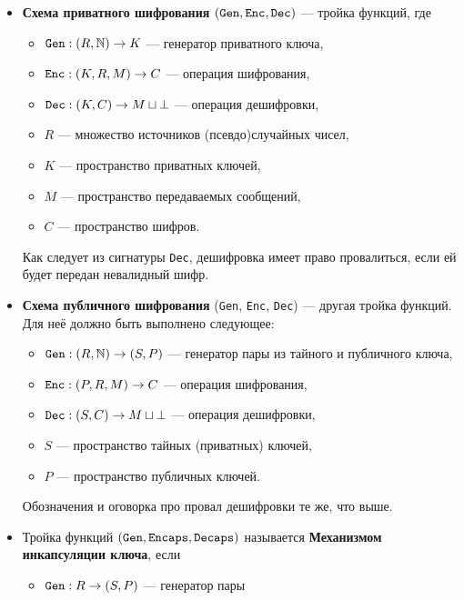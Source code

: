 \documentclass[a4paper,14pt]{extarticle}
\begin{document}
\begin{itemize}
    \item \textbf{Схема приватного шифрования}
        $(\verb|Gen|, \verb|Enc|, \verb|Dec|)$ --- тройка функций, где
        \begin{itemize}
            \item $\verb|Gen|: (R, \mathbb{N}) \to K$ --- генератор приватного
                ключа,
            \item $\verb|Enc|: (K, R, M) \to C$ --- операция шифрования,
            \item $\verb|Dec|: (K, C) \to M \sqcup \bot$ --- операция
                дешифровки,
            \item $R$ --- множество источников (псевдо)случайных чисел,
            \item $K$ --- пространство приватных ключей,
            \item $M$ --- пространство передаваемых сообщений,
            \item $C$ --- пространство шифров.
        \end{itemize}
        Как следует из сигнатуры \verb|Dec|, дешифровка имеет право провалиться,
        если ей будет передан невалидный шифр.
    \item \textbf{Схема публичного шифрования}
        (\verb|Gen|, \verb|Enc|, \verb|Dec|) --- другая тройка функций. Для неё
        должно быть выполнено следующее:
        \begin{itemize}
            \item $\verb|Gen|: (R, \mathbb{N}) \to (S, P)$ --- генератор пары
                из тайного и публичного ключа,
            \item $\verb|Enc|: (P, R, M) \to C$ --- операция шифрования,
            \item $\verb|Dec|: (S, C) \to M \sqcup \bot$ --- операция
                дешифровки,
            \item $S$ --- пространство тайных (приватных) ключей,
            \item $P$ --- пространство публичных ключей.
        \end{itemize}
        Обозначения и оговорка про провал дешифровки те же, что выше.
    \item Тройка функций $(\verb|Gen|, \verb|Encaps|, \verb|Decaps|)$ называется
        \textbf{Механизмом инкапсуляции ключа}, если
        \begin{itemize}
            \item $\verb|Gen|: R \to (S, P)$ --- генератор пары

\end{itemize}
\end{itemize}
\end{document}
